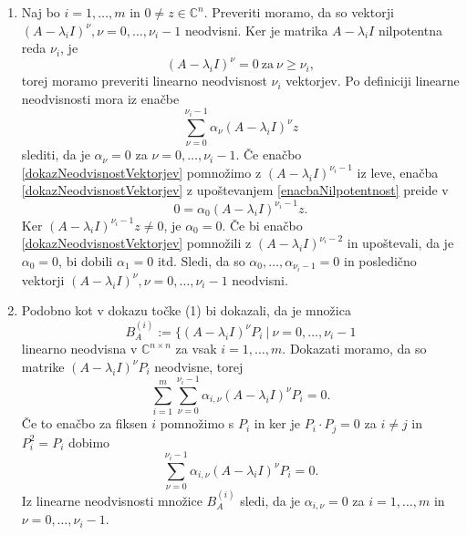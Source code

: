 \documentclass[mat1]{fmfdelo}
\newcommand{\C}{\mathbb C}
\begin{document}
\begin{dokaz}
    \begin{enumerate}
        \item Naj bo $i = 1, \ldots, m$ in $0 \neq z \in \C^n$. Preveriti moramo, da so vektorji $(A - \lambda_i I)^\nu, \nu = 0, \ldots, \nu_i-1$ neodvisni. Ker je matrika $A - \lambda_i I$ nilpotentna reda $\nu_i$, je
        \begin{equation}\label{enacbaNilpotentnost}
            (A - \lambda_i I)^\nu = 0\ \text{za}\ \nu \geq \nu_i,
        \end{equation}
        torej moramo preveriti linearno neodvisnost $\nu_i$ vektorjev. Po definiciji linearne neodvisnosti mora iz enačbe
        \begin{equation}\label{dokazNeodvisnostVektorjev}
            \sum_{\nu = 0}^{\nu_i - 1} \alpha_\nu (A - \lambda_i I)^\nu z
        \end{equation}
        slediti, da je $\alpha_\nu = 0$ za $\nu = 0, \ldots, \nu_i-1$. Če enačbo \ref{dokazNeodvisnostVektorjev} pomnožimo z $(A - \lambda_i I)^{\nu_i-1}$ iz leve, enačba \eqref{dokazNeodvisnostVektorjev} z upoštevanjem \eqref{enacbaNilpotentnost} preide v
        \begin{equation}
            0 = \alpha_0 (A-\lambda_i I)^{\nu_i-1} z.
        \end{equation}
        Ker $(A-\lambda_i I)^{\nu_i-1} z \neq 0$, je $\alpha_0 = 0$. Če bi enačbo \eqref{dokazNeodvisnostVektorjev} pomnožili z $(A - \lambda_i I)^{\nu_i-2}$ in upoštevali, da je $\alpha_0 = 0$, bi dobili $\alpha_1 = 0$ itd. Sledi, da so $\alpha_0, \ldots, \alpha_{\nu_i - 1} = 0$ in posledično vektorji $(A - \lambda_i I)^\nu, \nu = 0, \ldots, \nu_i-1$ neodvisni.

        \item Podobno kot v dokazu točke (1) bi dokazali, da je množica
        \begin{equation}
            B_A^{(i)} := \{(A-\lambda_i I)^\nu P_i\ |\ \nu = 0, \ldots, \nu_i-1
        \end{equation}
        linearno neodvisna v $\C^{n \times n}$ za vsak $i = 1, \ldots, m$. Dokazati moramo, da so matrike $(A-\lambda_i I)^{\nu} P_i$ neodvisne, torej
        \begin{equation}
            \sum_{i=1}^m \sum_{\nu=0}^{\nu_i-1} \alpha_{i, \nu} (A-\lambda_i I)^{\nu} P_i = 0.
        \end{equation}
        Če to enačbo za fiksen $i$ pomnožimo s $P_i$ in ker je $P_i \cdot P_j = 0$ za $i \neq j$ in $P_i^2 = P_i$ dobimo
        \begin{equation}
            \sum_{\nu = 0}^{\nu_i - 1} \alpha_{i, \nu} (A-\lambda_i I)^{\nu} P_i = 0.
        \end{equation}
        Iz linearne neodvisnosti množice $B_A^{(i)}$ sledi, da je $\alpha_{i, \nu} = 0$ za $i = 1, \ldots, m$ in $\nu = 0, \ldots, \nu_i-1$.
    \end{enumerate}
\end{dokaz}
\end{document}
